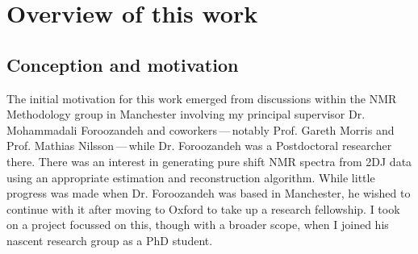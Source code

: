 \section{Overview of this work}

\subsection{Conception and motivation}
The initial motivation for this work emerged from discussions within the NMR
Methodology group in Manchester involving my principal
supervisor Dr. Mohammadali Foroozandeh and coworkers\,---\,notably Prof.
Gareth Morris and Prof. Mathias Nilsson\,---\,while Dr. Foroozandeh was a
Postdoctoral
researcher there. There was an interest in generating pure shift \ac{NMR}
spectra from \acs{2DJ} data using an appropriate estimation and
reconstruction algorithm. While little progress was made when Dr. Foroozandeh
was based in Manchester, he wished to continue with it after moving to Oxford
to take up a research fellowship. I took on a project focussed on this,
though with a broader scope, when I joined his nascent research group as a PhD
student.


